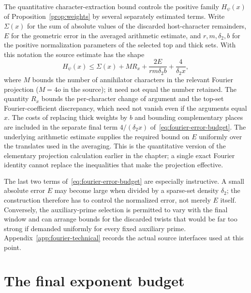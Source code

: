 \documentclass[11pt,openany,oneside]{scrbook}
\theoremstyle{definition}
\theoremstyle{remark}
\begin{document}
The quantitative character-extraction bound controls the positive family $H_\psi(x)$ of Proposition~\ref{prop:weights} by several separately estimated terms. Write $\Sigma(x)$ for the sum of absolute values of the discarded host-character remainders, $E$ for the geometric error in the averaged arithmetic estimate, and $r,m,\delta_2,b$ for the positive normalization parameters of the selected top and thick sets. With this notation the source estimate has the shape
\begin{equation}\label{eq:fourier-error-budget}
H_\psi(x)\le\Sigma(x)+M R_x
+\frac{2E}{rm\delta_2b}+\frac{4}{\delta_2x},
\end{equation}
where $M$ bounds the number of annihilator characters in the relevant Fourier projection ($M=4o$ in the source); it need not equal the number retained. The quantity $R_x$ bounds the per-character change of argument and the top-set Fourier-coefficient discrepancy, which need not vanish even if the arguments equal $x$. The costs of replacing thick weights by $b$ and bounding complementary places are included in the separate final term $4/(\delta_2 x)$ of~\eqref{eq:fourier-error-budget}. The underlying arithmetic estimate supplies the required bound on $E$ uniformly over the translates used in the averaging.  This is the quantitative version of the elementary projection calculation earlier in the chapter; a single exact Fourier identity cannot replace the inequalities that make the projection effective.

The last two terms of~\eqref{eq:fourier-error-budget} are especially instructive.  A small absolute error $E$ may become large when divided by a sparse-set density $\delta_2$; the construction therefore has to control the normalized error, not merely $E$ itself.  Conversely, the auxiliary-prime selection is permitted to vary with the final window and can arrange bounds for the discarded twists that would be far too strong if demanded uniformly for every fixed auxiliary prime.  Appendix~\ref{app:fourier-technical} records the actual source interfaces used at this point.

\section{The final exponent budget}
\end{document}
